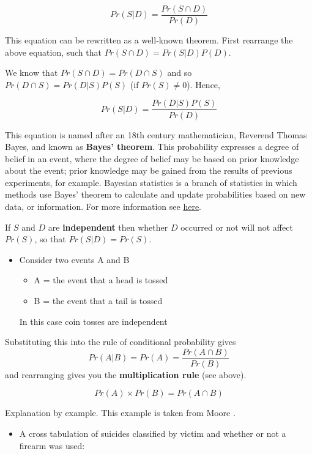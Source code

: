 \documentclass[
  oneside]{krantz}
\providecommand{\tightlist}{%
  \setlength{\itemsep}{0pt}\setlength{\parskip}{0pt}}
\begin{document}
\[Pr(S|D) = \frac{Pr(S \cap D)}{Pr(D)}\]

This equation can be rewritten as a well-known theorem. First rearrange the above equation, such that \(Pr(S \cap D) = Pr(S|D)P(D)\).

We know that \(Pr(S \cap D) = Pr(D \cap S)\) and so \(Pr(D \cap S) = Pr(D|S)P(S)\) (if \(Pr(S) \ne 0\)). Hence,

\[Pr(S|D) = \frac{Pr(D|S)P(S)}{Pr(D)}\]

This equation is named after an 18th century mathematician, Reverend Thomas Bayes, and known as \textbf{Bayes' theorem}. This probability expresses a degree of belief in an event, where the degree of belief may be based on prior knowledge about the event; prior knowledge may be gained from the results of previous experiments, for example. Bayesian statistics is a branch of statistics in which methods use Bayes' theorem to calculate and update probabilities based on new data, or information. For more information see \href{https://betterexplained.com/articles/an-intuitive-and-short-explanation-of-bayes-theorem/}{here}.

If \(S\) and \(D\) are \textbf{independent} then whether \(D\) occurred or not will not affect \(Pr(S)\), so that \(Pr(S|D) = Pr(S)\).

\begin{itemize}
\item
  Consider two events A and B

  \begin{itemize}
  \tightlist
  \item
    A = the event that a head is tossed
  \item
    B = the event that a tail is tossed
  \end{itemize}

  In this case coin tosses are independent
\end{itemize}

Substituting this into the rule of conditional probability gives
\[Pr(A|B) = Pr(A) = \frac{Pr(A \cap B)} {Pr(B)}\]
and rearranging gives you the \textbf{multiplication rule} (see above).

\[ Pr(A) \times Pr(B) = Pr(A \cap B) \]

Explanation by example. This example is taken from Moore \citeyearpar{Moore1992}.

\begin{itemize}
\tightlist
\item
  A cross tabulation of suicides classified by victim and whether or not a firearm was used:
\end{itemize}
\end{document}
